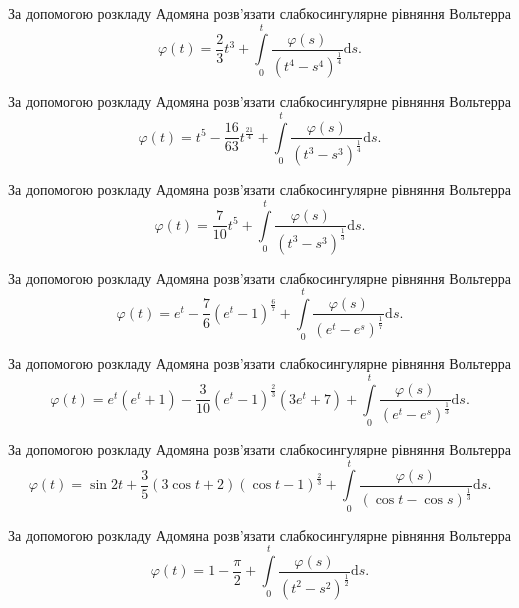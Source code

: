 \documentclass[12pt]{extarticle}
\begin{document}
\begin{Exercise}
За допомогою розкладу Адомяна розв’язати слабкосингулярне рівняння Вольтерра \[\varphi(t) = \dfrac{2}{3} t^3 + \int\limits_{0}^{t} \dfrac{\varphi(s)}{(t^4 - s^4)^\frac{1}{4}} \mathrm{d}s.\]
\end{Exercise}

\begin{Exercise}
За допомогою розкладу Адомяна розв’язати слабкосингулярне рівняння Вольтерра \[\varphi(t) = t^5 - \dfrac{16}{63}t^{\frac{21}{4}} + \int\limits_{0}^{t} \dfrac{\varphi(s)}{(t^3 - s^3)^\frac{1}{4}} \mathrm{d}s.\]
\end{Exercise}

\begin{Exercise}
За допомогою розкладу Адомяна розв’язати слабкосингулярне рівняння Вольтерра \[\varphi(t) = \dfrac{7}{10}t^5 + \int\limits_{0}^{t} \dfrac{\varphi(s)}{(t^3 - s^3)^\frac{1}{3}} \mathrm{d}s.\]
\end{Exercise}

\begin{Exercise}
За допомогою розкладу Адомяна розв’язати слабкосингулярне рівняння Вольтерра \[\varphi(t) = e^t - \dfrac{7}{6}\left(e^t - 1\right)^\frac{6}{7} + \int\limits_{0}^{t} \dfrac{\varphi(s)}{\left(e^t - e^s\right)^\frac{1}{7}} \mathrm{d}s.\]
\end{Exercise}

\begin{Exercise}
За допомогою розкладу Адомяна розв’язати слабкосингулярне рівняння Вольтерра \[\varphi(t) = e^t (e^t+1) - \dfrac{3}{10}\left(e^t - 1\right)^\frac{2}{3}(3e^t+7) + \int\limits_{0}^{t} \dfrac{\varphi(s)}{\left(e^t - e^s\right)^\frac{1}{3}} \mathrm{d}s.\]
\end{Exercise}

\begin{Exercise}
За допомогою розкладу Адомяна розв’язати слабкосингулярне рівняння Вольтерра \[\varphi(t) = \sin 2t + \dfrac{3}{5}\left(3 \cos t + 2\right)(\cos t - 1)^\frac{2}{3} + \int\limits_{0}^{t} \dfrac{\varphi(s)}{\left(\cos t - \cos s\right)^\frac{1}{3}} \mathrm{d}s.\]
\end{Exercise}

\begin{Exercise}
За допомогою розкладу Адомяна розв’язати слабкосингулярне рівняння Вольтерра \[\varphi(t) = 1 - \dfrac{\pi}{2} + \int\limits_{0}^{t} \dfrac{\varphi(s)}{\left(t^2 - s^2\right)^\frac{1}{2}} \mathrm{d}s.\]
\end{Exercise}
\end{document}
